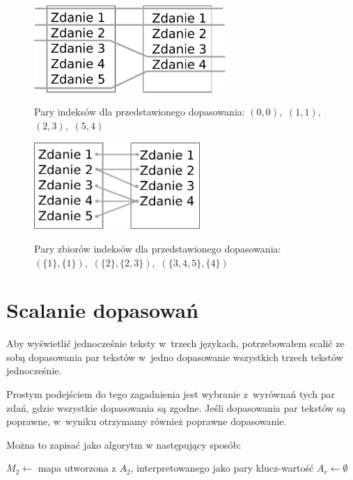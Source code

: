 \documentclass{pracamgr}
\begin{document}
\begin{figure}[h]
  \centering \small
  \caption{Pary indeksów dla przedstawionego dopasowania:
    $(0,0),$ $(1,1),$ $(2, 3),$ $(5, 4)$}
  \includegraphics[height=1.3in]{pairs.eps}
  \label{fig:pairs}
\end{figure}

\begin{figure}[h]
  \centering \small
  \caption{Pary zbiorów indeksów dla przedstawionego dopasowania:
    $(\{1\},\{1\}),$ $(\{2\},\{2,3\}),$ $(\{3,4,5\},\{4\})$}
  \includegraphics[height=1.3in]{setpairs.eps}
  \label{fig:setpairs}
\end{figure}

\section{Scalanie dopasowań}

Aby wyświetlić jednocześnie teksty w~trzech językach, potrzebowałem
scalić ze sobą dopasowania par tekstów w~jedno dopasowanie wszystkich
trzech tekstów jednocześnie.

Prostym podejściem do tego zagadnienia jest wybranie z~wyrównań tych
par zdań, gdzie wszystkie dopasowania są zgodne. Jeśli dopasowania par
tekstów są poprawne, w~wyniku otrzymamy również poprawne dopasowanie.

Można to zapisać jako algorytm w następujący sposób:

\begin{algorithm}[H]
  $M_2 \leftarrow$ mapa utworzona z $A_2$, interpretowanego jako pary klucz-wartość \;
  $A_r \leftarrow \emptyset$ \;
\end{algorithm}
\end{document}

